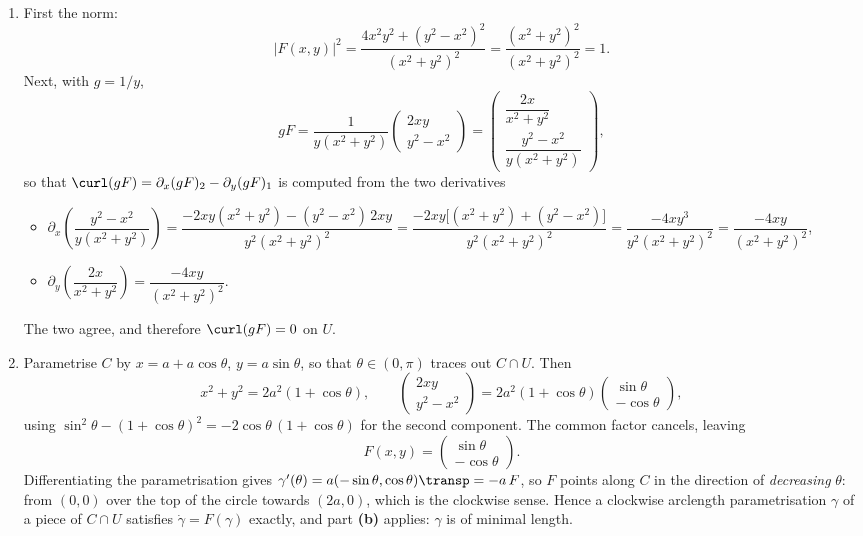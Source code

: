 \begin{exercisesolution}
\begin{enumerate}[label=\textbf{(\alph*)}]
  \item First the norm:
\[\lvert F(x,y)\rvert^2 = \frac{4x^2y^2 + (y^2-x^2)^2}{(x^2+y^2)^2} = \frac{(x^2+y^2)^2}{(x^2+y^2)^2} = 1.\]
Next, with $g = 1/y$,
\[gF = \frac{1}{y(x^2+y^2)} \begin{pmatrix} 2xy \\ y^2-x^2 \end{pmatrix} = \begin{pmatrix} \dfrac{2x}{x^2+y^2} \\[2mm] \dfrac{y^2-x^2}{y(x^2+y^2)} \end{pmatrix},\]
so that $\curl(gF) = \partial_x (gF)_2 - \partial_y (gF)_1$ is computed from the two derivatives
\begin{itemize}
  \item $\partial_x \left(\dfrac{y^2-x^2}{y(x^2+y^2)}\right)
    = \dfrac{-2xy(x^2+y^2) - (y^2-x^2)\,2xy}{y^2(x^2+y^2)^2}
    = \dfrac{-2xy\big[(x^2+y^2)+(y^2-x^2)\big]}{y^2(x^2+y^2)^2}
    = \dfrac{-4xy^3}{y^2(x^2+y^2)^2}
    = \dfrac{-4xy}{(x^2+y^2)^2}$,
  \item $\partial_y \left(\dfrac{2x}{x^2+y^2}\right) = \dfrac{-4xy}{(x^2+y^2)^2}$.
\end{itemize}
The two agree, and therefore $\curl(gF) = 0$ on $U$.

  \item Parametrise $C$ by $x = a + a\cos\theta$, $y = a\sin\theta$, so that $\theta \in (0,\pi)$
    traces out $C \cap U$. Then
\[x^2+y^2 = 2a^2(1+\cos\theta), \qquad
  \begin{pmatrix} 2xy \\ y^2-x^2 \end{pmatrix} = 2a^2(1+\cos\theta) \begin{pmatrix} \sin\theta \\ -\cos\theta \end{pmatrix},\]
    using $\sin^2\theta - (1+\cos\theta)^2 = -2\cos\theta\,(1+\cos\theta)$ for the second component.
    The common factor cancels, leaving
\[F(x,y) = \begin{pmatrix} \sin\theta \\ -\cos\theta \end{pmatrix}.\]
    Differentiating the parametrisation gives $\gamma'(\theta) = a(-\sin\theta, \cos\theta)\transp = -a\,F$,
    so $F$ points along $C$ in the direction of \emph{decreasing} $\theta$: from $(0,0)$ over the top
    of the circle towards $(2a,0)$, which is the clockwise sense. Hence a clockwise arclength
    parametrisation $\gamma$ of a piece of $C \cap U$ satisfies $\dot\gamma = F(\gamma)$ exactly, and
    part \textbf{(b)} applies: $\gamma$ is of minimal length.


\end{enumerate}
\end{exercisesolution}
